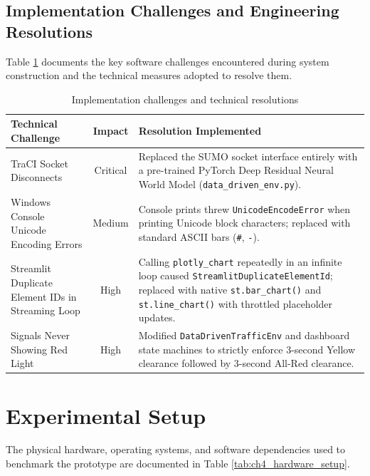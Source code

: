 \subsection{Implementation Challenges and Engineering Resolutions}
Table \ref{tab:ch4_challenges} documents the key software challenges encountered during system construction and the technical measures adopted to resolve them.

\begin{table}[htbp]
\centering
\small
\caption{Implementation challenges and technical resolutions}
\label{tab:ch4_challenges}
\begin{tabularx}{\textwidth}{|p{3.5cm}|c|X|}
\hline
\textbf{Technical Challenge} & \textbf{Impact} & \textbf{Resolution Implemented} \\ \hline
TraCI Socket Disconnects & Critical & Replaced the SUMO socket interface entirely with a pre-trained PyTorch Deep Residual Neural World Model (\texttt{data\_driven\_env.py}). \\ \hline
Windows Console Unicode Encoding Errors & Medium & Console prints threw \texttt{UnicodeEncodeError} when printing Unicode block characters; replaced with standard ASCII bars (\texttt{\#}, \texttt{-}). \\ \hline
Streamlit Duplicate Element IDs in Streaming Loop & High & Calling \texttt{plotly\_chart} repeatedly in an infinite loop caused \texttt{StreamlitDuplicateElementId}; replaced with native \texttt{st.bar\_chart()} and \texttt{st.line\_chart()} with throttled placeholder updates. \\ \hline
Signals Never Showing Red Light & High & Modified \texttt{DataDrivenTrafficEnv} and dashboard state machines to strictly enforce 3-second Yellow clearance followed by 3-second All-Red clearance. \\ \hline
\end{tabularx}
\end{table}

\section{Experimental Setup}
\label{sec:ch4_exp_setup}
The physical hardware, operating systems, and software dependencies used to benchmark the prototype are documented in Table \ref{tab:ch4_hardware_setup}.

